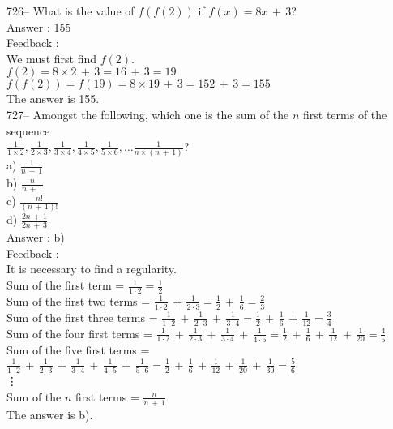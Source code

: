\documentclass[letterpaper, 12pt]{article}
\begin{document}
726-- What is the value of $f(f(2))$ if $f(x)=8x\,+\,3$?\\

Answer : 155\\

Feedback : \\
We must first find $f(2)$.\\
$f(2)=8\times2\,+\,3=16\,+\,3=19$\\
$f(f(2))=f(19)=8\times19\,+\,3= 152\,+\,3=155$\\
The answer is 155.\\

727-- Amongst the following, which one is the sum of the $n$ first terms of the sequence \\$\frac{1}{1\times2}, \frac{1}{2\times3},
\frac{1}{3\times4}, \frac{1}{4\times5}, \frac{1}{5\times6}, \ldots
\frac{1}{n\times(n\,+\,1)}$?\\
a) $\frac{1}{n\,+\,1}$\\[2mm]
b) $\frac{n}{n\,+\,1}$\\[2mm]
c) $\frac{n!}{(n\,+\,1)!}$\\[2mm]
d) $\frac{2n\,+\,1}{2n\,+\,3}$\\

Answer : b)\\

Feedback : \\
It is necessary to find a regularity. \\
Sum of the first term = $\frac{1}{1\cdot2}=\frac{1}{2}$\\[2mm]
Sum of the first two terms =
$\frac{1}{1\cdot2}\,+\,\frac{1}{2\cdot3}=\frac{1}{2}\,+\,\frac{1}{6}=\frac{2}{3}$\\[2mm]
Sum of the first three terms =
$\frac{1}{1\cdot2}\,+\,\frac{1}{2\cdot3}\,+\,\frac{1}{3\cdot4}=\frac{1}{2}\,+\,\frac{1}{6}\,+\,\frac{1}{12}=\frac{3}{4}$\\[2mm]
Sum of the four first terms =
$\frac{1}{1\cdot2}\,+\,\frac{1}{2\cdot3}\,+\,\frac{1}{3\cdot4}\,+\,\frac{1}{4\cdot5}=\frac{1}{2}\,+\,\frac{1}{6}\,+\,\frac{1}{12}\,+\,\frac{1}{20}=\frac{4}{5}$\\[2mm]
Sum of the five first terms =
$\frac{1}{1\cdot2}\,+\,\frac{1}{2\cdot3}\,+\,\frac{1}{3\cdot4}\,+\,\frac{1}{4\cdot5}\,+\,\frac{1}{5\cdot6}=\frac{1}{2}\,+\,\frac{1}{6}\,+\,\frac{1}{12}\,+\,\frac{1}{20}\,+\,\frac{1}{30}=\frac{5}{6}$\\
\vdots\\
Sum of the $n$ first terms = $\frac{n}{n\,+\,1}$\\[2mm]
The answer is b).\\
\end{document}
